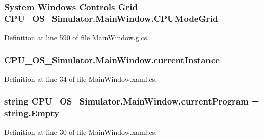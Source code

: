\subsubsection[{C\+P\+U\+Mode\+Grid}]{\setlength{\rightskip}{0pt plus 5cm}System Windows Controls Grid C\+P\+U\+\_\+\+O\+S\+\_\+\+Simulator.\+Main\+Window.\+C\+P\+U\+Mode\+Grid\hspace{0.3cm}{\ttfamily [package]}}\label{class_c_p_u___o_s___simulator_1_1_main_window_ab6afb45d3f05517e9df6af167752be77}


Definition at line 590 of file Main\+Window.\+g.\+cs.

\hypertarget{class_c_p_u___o_s___simulator_1_1_main_window_a1280266cc57403a91f08a8350dee05cc}{}
\subsubsection[{current\+Instance}]{ C\+P\+U\+\_\+\+O\+S\+\_\+\+Simulator.\+Main\+Window.\+current\+Instance\hspace{0.3cm}{\ttfamily [static]}}\label{class_c_p_u___o_s___simulator_1_1_main_window_a1280266cc57403a91f08a8350dee05cc}


Definition at line 34 of file Main\+Window.\+xaml.\+cs.

\hypertarget{class_c_p_u___o_s___simulator_1_1_main_window_a91f063d9cf776004dc74e719ef942907}{}
\subsubsection[{current\+Program}]{\setlength{\rightskip}{0pt plus 5cm}string C\+P\+U\+\_\+\+O\+S\+\_\+\+Simulator.\+Main\+Window.\+current\+Program = string.\+Empty}\label{class_c_p_u___o_s___simulator_1_1_main_window_a91f063d9cf776004dc74e719ef942907}


Definition at line 30 of file Main\+Window.\+xaml.\+cs.

